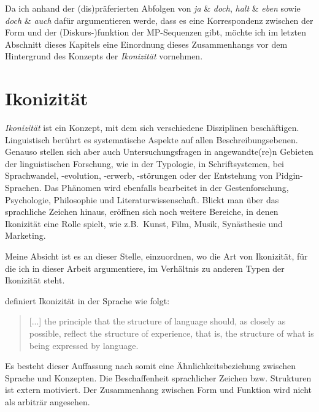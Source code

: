 \noindent 
Da ich anhand der (dis)präferierten Abfolgen von \textit{ja} \& \textit{doch}, \textit{halt} \& \textit{eben} sowie \textit{doch} \& \textit{auch} dafür argumentieren werde, dass es eine Korrespondenz zwischen der Form und der (Diskurs-)funktion der MP-Sequenzen gibt, möchte ich im letz\-ten Abschnitt dieses Kapitels eine Einordnung dieses Zusammenhangs vor dem Hintergrund des Konzepts der \textit{Ikoni\-zität} vornehmen.

\section{Ikonizität}
\label{sec:ikonizität}
\textit{Ikonizität} ist ein Konzept, mit dem sich verschiedene Disziplinen beschäftigen. Linguistisch berührt es systematische Aspekte auf allen Beschreibungsebenen. Genauso stellen sich aber auch Untersuchungsfragen in angewandte(re)n Gebie\-ten der linguistischen Forschung, wie in  der Typologie, in  Schriftsystemen, bei  Sprachwandel,  -evolution,  -erwerb, -störungen  oder der  Entstehung von Pidgin-Sprachen. Das Phänomen wird ebenfalls bearbeitet in der Gestenforschung, Psychologie, Philosophie und Literaturwissenschaft. Blickt man über das sprachliche Zeichen hinaus, eröffnen sich noch weitere Bereiche, in denen Ikonizität eine Rolle spielt, wie z.B.\ Kunst, Film, Musik, Synästhesie und Marketing. 

Meine Absicht ist es an dieser Stelle, einzuordnen, wo die Art von Ikonizität, für die ich in dieser Arbeit argumentiere, im Verhältnis zu anderen Typen der Ikonizität steht. 

\citet[129]{Croft1995} definiert Ikonizität in der Sprache wie folgt:
\begin{quotation} 
[...] the principle that the structure of language should, as closely as possible, reflect the structure of experience, that is, the structure of what is being expressed by language.
\end{quotation}
Es besteht dieser Auffassung nach somit eine Ähnlichkeitsbeziehung zwischen Sprache und Konzepten. Die Beschaffenheit sprachlicher Zeichen bzw. Strukturen ist extern motiviert. Der Zusammenhang zwischen Form und Funktion wird nicht als arbiträr  angesehen.

